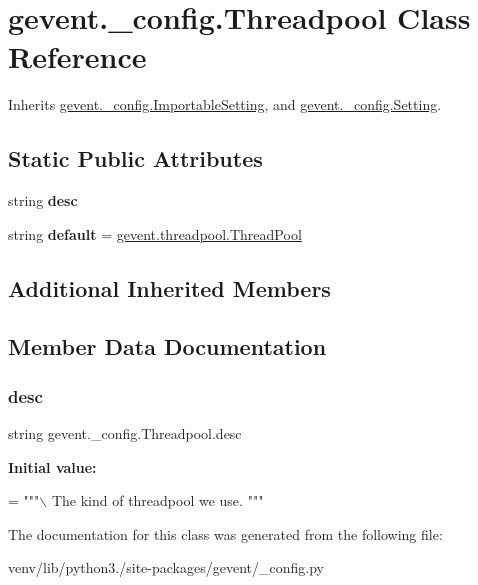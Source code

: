 \hypertarget{classgevent_1_1__config_1_1_threadpool}{}\section{gevent.\+\_\+config.\+Threadpool Class Reference}
\label{classgevent_1_1__config_1_1_threadpool}


Inherits \hyperlink{classgevent_1_1__config_1_1_importable_setting}{gevent.\+\_\+config.\+Importable\+Setting}, and \hyperlink{classgevent_1_1__config_1_1_setting}{gevent.\+\_\+config.\+Setting}.

\subsection*{Static Public Attributes}
\begin{DoxyCompactItemize}
\item 
string {\bfseries desc}
\item 
\mbox{\label{classgevent_1_1__config_1_1_threadpool_a29abeea8ed10a913683e19ce1cd9c999}} 
string {\bfseries default} = \textquotesingle{}\hyperlink{classgevent_1_1threadpool_1_1_thread_pool}{gevent.\+threadpool.\+Thread\+Pool}\textquotesingle{}
\end{DoxyCompactItemize}
\subsection*{Additional Inherited Members}


\subsection{Member Data Documentation}
\mbox{\label{classgevent_1_1__config_1_1_threadpool_a57420d68af232665a65f363343184963}} 
\subsubsection{\texorpdfstring{desc}{desc}}
{\footnotesize\ttfamily string gevent.\+\_\+config.\+Threadpool.\+desc\hspace{0.3cm}{\ttfamily [static]}}

{\bfseries Initial value\+:}
\begin{DoxyCode}
=  \textcolor{stringliteral}{"""\(\backslash\)}
\textcolor{stringliteral}{The kind of threadpool we use.}
\textcolor{stringliteral}{"""}
\end{DoxyCode}


The documentation for this class was generated from the following file\+:\begin{DoxyCompactItemize}
\item 
venv/lib/python3./site-\/packages/gevent/\+\_\+config.\+py\end{DoxyCompactItemize}
